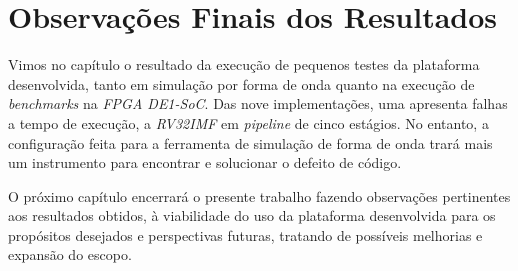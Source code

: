 \section{Observações Finais dos Resultados}
    { Vimos no capítulo o resultado da execução de pequenos testes da plataforma
        desenvolvida, tanto em simulação por forma de onda quanto na execução de
        \textit{benchmarks} na \textit{FPGA DE1-SoC}. Das nove implementações,
        uma apresenta falhas a tempo de execução, a \textit{RV32IMF} em
        \textit{pipeline} de cinco estágios. No entanto, a configuração feita para
        a ferramenta de simulação de forma de onda trará mais um instrumento para
        encontrar e solucionar o defeito de código.
    }

    { O próximo capítulo encerrará o presente trabalho fazendo observações
        pertinentes aos resultados obtidos, à viabilidade do uso da plataforma
        desenvolvida para os propósitos desejados e perspectivas futuras,
        tratando de possíveis melhorias e expansão do escopo.
    }

